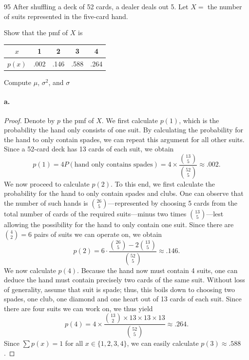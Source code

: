 \documentclass{exam}
\begin{document}
\begin{problem}{95}
	After shuffling a deck of 52 cards, a dealer deals out 5. Let $X =$ the number of suits represented in the five-card hand.
	\begin{tasks}[label=\textbf{\alph*.}]
		\task Show that the pmf of $X$ is
		\begin{center}
			\bgroup
			\def\arraystretch{1.5}
			\begin{tabular}{c|cccc}
				$x$ & 1 & 2 & 3 & 4 \\
				\hline
				$p(x)$ & .002 & .146 & .588 & .264
			\end{tabular}
			\egroup
		\end{center}
		\task Compute $\mu$, $\sigma^2$, and $\sigma$
	\end{tasks}
\end{problem}

\paragraph{a.}
\begin{proof}
	Denote by $p$ the pmf of $X$. We first calculate $p(1)$, which is the probability the hand only consists of one suit. By calculating the probability for the hand to only contain spades, we can repeat this argument for all other suits. Since a 52-card deck has 13 cards of each suit, we obtain
	\[
		p(1) = 4P(\text{hand only contains spades}) = 4 \times \frac{\binom{13}5}{\binom{52}5} \approx .002.
	\]
	We now proceed to calculate $p(2)$. To this end, we first calculate the probability for the hand to only contain spades and clubs. One can observe that the number of such hands is $\binom{26}5$---represented by choosing 5 cards from the total number of cards of the required suits---minus two times $\binom{13}5$---lest allowing the possibility for the hand to only contain one suit. Since there are $\binom42 = 6$ pairs of suits we can operate on, we obtain
	\[
		p(2) = 6 \cdot \frac{\binom{26}5 - 2\binom{13}5}{\binom{52}5} \approx .146.
	\]
	We now calculate $p(4)$. Because the hand now must contain 4 suits, one can deduce the hand must contain precisely two cards of the same suit. Without loss of generality, assume that suit is spade; thus, this boils down to choosing two spades, one club, one diamond and one heart out of 13 cards of each suit. Since there are four suits we can work on, we thus yield
	\[
		p(4) = 4 \times \frac{\binom{13}2 \times 13 \times 13 \times 13}{\binom{52}5} \approx .264.
	\]
	Since $\sum p(x) = 1$ for all $x \in \{1, 2, 3, 4\}$, we can easily calculate $p(3) \approx .588$.
\end{proof}
\end{document}
